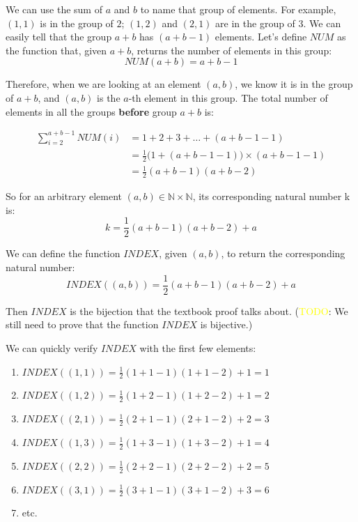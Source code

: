 \documentclass[12pt, letterpaper, oneside]{book}
\begin{document}
We can use the sum of $a$ and $b$ to name that group of elements. For example,
$(1, 1)$ is in the group of $2$; $(1, 2)$ and $(2, 1)$ are in the group of $3$.
We can easily tell that the group $a + b$ has $(a + b -1)$ elements. Let's
define $NUM$ as the function that, given $a + b$, returns the number of elements
in this group: \[NUM(a + b) = a + b -1\]

Therefore, when we are looking at an element $(a, b)$, we know it is in the
group of $a + b$, and $(a, b)$ is the $a$-th element in this group. The total
number of elements in all the groups \textbf{before} group $a + b$ is:

\begin{equation*}
  \begin{split}
    \sum_{i=2}^{a + b - 1} NUM(i)
    & = 1 + 2 + 3 + \ldots + (a + b - 1 - 1) \\
    & = \frac{1}{2}\bigl(1 + (a + b - 1 - 1)\bigr) \times (a + b - 1 - 1) \\
    & = \frac{1}{2}(a + b - 1)(a + b - 2)
  \end{split}
\end{equation*}

So for an arbitrary element $(a, b) \in \mathbb{N} \times \mathbb{N}$, its
corresponding natural number k is:
\[ k = \frac{1}{2}(a + b - 1)(a + b - 2) + a \]

We can define the function $INDEX$, given $(a, b)$, to return the corresponding
natural number:
\[ INDEX((a, b)) = \frac{1}{2}(a + b - 1)(a + b - 2) + a \]

Then $INDEX$ is the bijection that the textbook proof talks about.
(\colorbox{red!100}{\textcolor{yellow}{TODO}}: We still need to prove that
the function $INDEX$ is bijective.)

We can quickly verify $INDEX$ with the first few elements:

\begin{enumerate}
  \item $INDEX((1, 1)) = \frac{1}{2}(1 + 1 - 1)(1 + 1 - 2) + 1 = 1$
  \item $INDEX((1, 2)) = \frac{1}{2}(1 + 2 - 1)(1 + 2 - 2) + 1 = 2$
  \item $INDEX((2, 1)) = \frac{1}{2}(2 + 1 - 1)(2 + 1 - 2) + 2 = 3$
  \item $INDEX((1, 3)) = \frac{1}{2}(1 + 3 - 1)(1 + 3 - 2) + 1 = 4$
  \item $INDEX((2, 2)) = \frac{1}{2}(2 + 2 - 1)(2 + 2 - 2) + 2 = 5$
  \item $INDEX((3, 1)) = \frac{1}{2}(3 + 1 - 1)(3 + 1 - 2) + 3 = 6$
  \item etc.
\end{enumerate}
\end{document}
